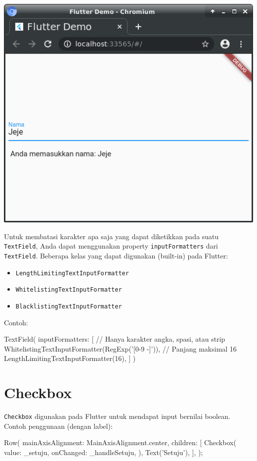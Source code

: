 \documentclass[a4paper,11pt]{article} %
\newcommand{\txtinline}[1]{\texttt{#1}}
\begin{document}
{\centering
\includegraphics[scale=0.5]{images/InputNama.png}
\par}

Untuk membatasi karakter apa saja yang dapat diketikkan pada suatu \txtinline{TextField},
Anda dapat menggunakan property \txtinline{inputFormatters} dari \txtinline{TextField}.
Beberapa kelas yang dapat digunakan (built-in) pada Flutter:
\begin{itemize}
\item \txtinline{LengthLimitingTextInputFormatter}
\item \txtinline{WhitelistingTextInputFormatter}
\item \txtinline{BlacklistingTextInputFormatter}
\end{itemize}
Contoh:
\begin{dartcode}
TextField(
  inputFormatters: [
    // Hanya karakter angka, spasi, atau strip
    WhitelistingTextInputFormatter(RegExp('[0-9 -]')),
    // Panjang maksimal 16
    LengthLimitingTextInputFormatter(16),
  ]
)
\end{dartcode}


\section{Checkbox}

\txtinline{Checkbox} digunakan pada Flutter untuk mendapat input bernilai boolean.
Contoh penggunaan (dengan label):

\begin{dartcode}
Row(
  mainAxisAlignment: MainAxisAlignment.center,
  children: [
    Checkbox(
      value: _setuju,
      onChanged: _handleSetuju,
    ),
    Text('Setuju'),
  ],
);
\end{dartcode}
\end{document}
